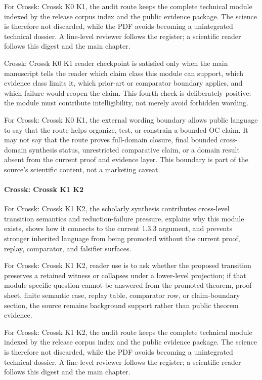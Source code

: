 For Crossk: Crossk K0 K1, the audit route keeps the complete technical module indexed by the release corpus index and the public evidence package. The science is therefore not discarded, while the PDF avoids becoming a unintegrated technical dossier. A line-level reviewer follows the register; a scientific reader follows this digest and the main chapter.


Crossk: Crossk K0 K1 reader checkpoint is satisfied only when the main manuscript tells the reader which claim class this module can support, which evidence class limits it, which prior-art or comparator boundary applies, and which failure would reopen the claim. This fourth check is deliberately positive: the module must contribute intelligibility, not merely avoid forbidden wording.


For Crossk: Crossk K0 K1, the external wording boundary allows public language to say that the route helps organize, test, or constrain a bounded OC claim. It may not say that the route proves full-domain closure, final bounded cross-domain synthesis status, unrestricted comparative claim, or a domain result absent from the current proof and evidence layer. This boundary is part of the source's scientific content, not a marketing caveat.


\paragraph{Crossk: Crossk K1 K2}

For Crossk: Crossk K1 K2, the scholarly synthesis contributes cross-level transition semantics and reduction-failure pressure, explains why this module exists, shows how it connects to the current 1.3.3 argument, and prevents stronger inherited language from being promoted without the current proof, replay, comparator, and falsifier surfaces.


For Crossk: Crossk K1 K2, reader use is to ask whether the proposed transition preserves a retained witness or collapses under a lower-level projection; if that module-specific question cannot be answered from the promoted theorem, proof sheet, finite semantic case, replay table, comparator row, or claim-boundary section, the source remains background support rather than public theorem evidence.


For Crossk: Crossk K1 K2, the audit route keeps the complete technical module indexed by the release corpus index and the public evidence package. The science is therefore not discarded, while the PDF avoids becoming a unintegrated technical dossier. A line-level reviewer follows the register; a scientific reader follows this digest and the main chapter.


